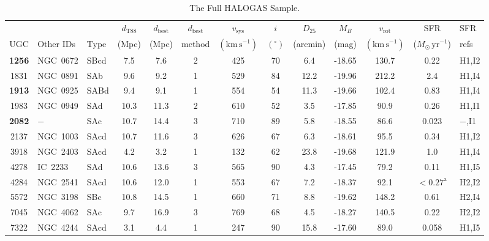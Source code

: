 \documentclass[oldversion]{aa}
\begin{document}
\begin{table}
\caption{The Full HALOGAS Sample.}
\label{table:sample}
\centering
\begin{tabular}{cllcccccccccl}
\hline\hline
~ & ~ & ~ & $d_\mathrm{T88}$ & $d_\mathrm{best}$ & $d_\mathrm{best}$ & $v_{\mathrm{sys}}$ & $i$ & $D_{25}$ & $M_{B}$ & $v_{\mathrm{rot}}$ & SFR & SFR \\
UGC & Other IDs & Type & (Mpc) & (Mpc) & method & $\mathrm{(km\,s^{-1})}$ & $(^{\circ})$ & (arcmin) & (mag) & $\mathrm{(km\,s^{-1})}$ & ($M_{\odot}\,\mathrm{yr}^{-1}$) & refs \\
\hline
{\bf 1256}        & NGC~0672        & SBcd  & 7.5  &  7.6 & 2 & 425  & 70 & 6.4  & -18.65 & 130.7 & 0.22               & H1,I2\\
1831              & NGC~0891        & SAb   & 9.6  &  9.2 & 1 & 529  & 84 & 12.2 & -19.96 & 212.2 & 2.4                & H1,I4\\
{\bf 1913}        & NGC~0925        & SABd  & 9.4  &  9.1 & 1 & 554  & 54 & 11.3 & -19.66 & 102.4 & 0.83               & H1,I4\\
1983              & NGC~0949        & SAd   & 10.3 & 11.3 & 2 & 610  & 52 & 3.5  & -17.85 & 90.9  & 0.26               & H1,I1\\
{\bf 2082}        & $-$             & SAc   & 10.7 & 14.4 & 3 & 710  & 89 & 5.8  & -18.55 & 86.6  & 0.023              & $-$,I1\\
2137              & NGC~1003        & SAcd  & 10.7 & 11.6 & 3 & 626  & 67 & 6.3  & -18.61 & 95.5  & 0.34               & H1,I2\\
3918              & NGC~2403        & SAcd  & 4.2  &  3.2 & 1 & 132  & 62 & 23.8 & -19.68 & 121.9 & 1.0                & H1,I4\\
4278              & IC~2233         & SAd   & 10.6 & 13.6 & 3 & 565  & 90 & 4.3  & -17.45 & 79.2  & 0.11               & H1,I5\\
4284              & NGC~2541        & SAcd  & 10.6 & 12.0 & 1 & 553  & 67 & 7.2  & -18.37 & 92.1  & $<0.27^\mathrm{a}$ & H2,I2\\
5572              & NGC~3198        & SBc   & 10.8 & 14.5 & 1 & 660  & 71 & 8.8  & -19.62 & 148.2 & 0.61               & H2,I4\\
7045              & NGC~4062        & SAc   & 9.7  & 16.9 & 3 & 769  & 68 & 4.5  & -18.27 & 140.5 & 0.22               & H2,I2\\
7322              & NGC~4244        & SAcd  & 3.1  &  4.4 & 1 & 247  & 90 & 15.8 & -17.60 & 89.0  & 0.058              & H1,I5\\

\end{tabular}
\end{table}
\end{document}
